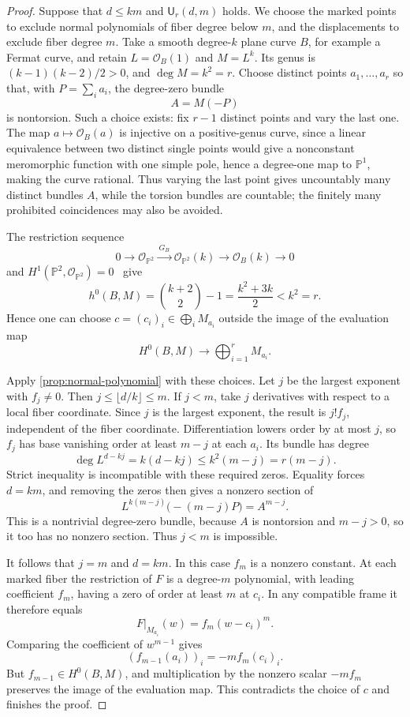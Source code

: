 \begin{proof}
Suppose that $d\le km$ and $\mathsf U_r(d,m)$ holds.  We choose the marked points to exclude normal polynomials of fiber degree below $m$, and the displacements to exclude fiber degree $m$. Take a smooth degree-$k$ plane curve $B$, for example a Fermat curve, and retain $L=\mathcal{O}_B(1)$ and $M=L^k$.  Its genus is $(k-1)(k-2)/2>0$, and $\deg M=k^2=r$.  Choose distinct points $a_1,\ldots,a_r$ so that, with $P=\sum_i a_i$, the degree-zero bundle
\[
 A=M(-P)
\]
is nontorsion.  Such a choice exists: fix $r-1$ distinct points and vary the last one.  The map $a\mapsto\mathcal{O}_B(a)$ is injective on a positive-genus curve, since a linear equivalence between two distinct single points would give a nonconstant meromorphic function with one simple pole, hence a degree-one map to $\mathbb{P}^1$, making the curve rational.  Thus varying the last point gives uncountably many distinct bundles $A$, while the torsion bundles are countable; the finitely many prohibited coincidences may also be avoided.

The restriction sequence
\[
 0\longrightarrow\mathcal{O}_{\mathbb{P}^2}
 \xrightarrow{\,G_B\,}\mathcal{O}_{\mathbb{P}^2}(k)
 \longrightarrow\mathcal{O}_B(k)\longrightarrow0
\]
and $H^1(\mathbb{P}^2,\mathcal{O}_{\mathbb{P}^2})=0$~\cite[Tag~\href{https://stacks.math.columbia.edu/tag/01XT}{01XT}]{Stacks} give
\[
 h^0(B,M)=\binom{k+2}{2}-1
         =\frac{k^2+3k}{2}<k^2=r.
\]
Hence one can choose $c=(c_i)_i\in\bigoplus_i M_{a_i}$ outside the image of the evaluation map
\[
 H^0(B,M)\longrightarrow\bigoplus_{i=1}^r M_{a_i}.
\]

Apply \cref{prop:normal-polynomial} with these choices.  Let $j$ be the largest exponent with $f_j\ne0$.  Then $j\le\lfloor d/k\rfloor\le m$.  If $j<m$, take $j$ derivatives with respect to a local fiber coordinate.  Since $j$ is the largest exponent, the result is $j!f_j$, independent of the fiber coordinate. Differentiation lowers order by at most $j$, so $f_j$ has base vanishing order at least $m-j$ at each $a_i$.  Its bundle has degree
\[
 \deg L^{d-kj}=k(d-kj)\le k^2(m-j)=r(m-j).
\]
Strict inequality is incompatible with these required zeros.  Equality forces $d=km$, and removing the zeros then gives a nonzero section of
\[
 L^{k(m-j)}\bigl(-(m-j)P\bigr)=A^{m-j}.
\]
This is a nontrivial degree-zero bundle, because $A$ is nontorsion and $m-j>0$, so it too has no nonzero section.  Thus $j<m$ is impossible.

It follows that $j=m$ and $d=km$.  In this case $f_m$ is a nonzero constant.  At each marked fiber the restriction of $F$ is a degree-$m$ polynomial, with leading coefficient $f_m$, having a zero of order at least $m$ at $c_i$.  In any compatible frame it therefore equals
\[
 F|_{M_{a_i}}(w)=f_m(w-c_i)^m.
\]
Comparing the coefficient of $w^{m-1}$ gives
\[
 (f_{m-1}(a_i))_i=-m f_m(c_i)_i.
\]
But $f_{m-1}\in H^0(B,M)$, and multiplication by the nonzero scalar $-m f_m$ preserves the image of the evaluation map.  This contradicts the choice of $c$ and finishes the proof.
\end{proof}

